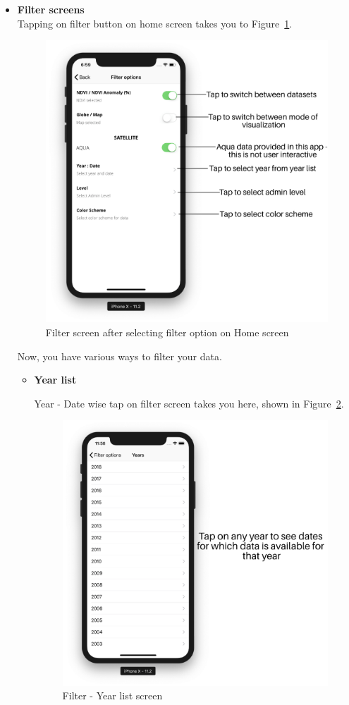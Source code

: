 \begin{itemize}
    
   \item \textbf{Filter screens} \\
    Tapping on filter button on home screen takes you to Figure~\ref{fig:filter_screen}.
    
    \begin{figure}[H]
            \centering
            \includegraphics[width=0.50\linewidth]{figures/ch2/filter_screen.png}
            \caption{\label{fig:filter_screen} Filter screen after selecting filter option on Home screen}
    \end{figure}
    
    Now, you have various ways to filter your data.
   
    \begin{itemize}
        \item \textbf{Year list}
        
        Year - Date wise tap on filter screen takes you here, shown in Figure~\ref{fig:years_list_screen}.
        
         \begin{figure}[H]
            \centering
            \includegraphics[width=0.50\linewidth]{figures/ch2/year_list.png}
            \caption{\label{fig:years_list_screen} Filter - Year list screen}
    \end{figure}
   

\end{itemize}
\end{itemize}
